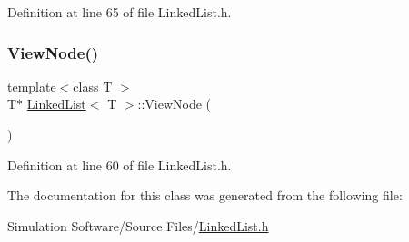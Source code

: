 Definition at line 65 of file Linked\+List.\+h.

\mbox{\label{class_linked_list_a926040c8f7faa215988def48e41797e5}} 
\subsubsection{\texorpdfstring{View\+Node()}{ViewNode()}}
{\footnotesize\ttfamily template$<$class T $>$ \\
T$\ast$ \hyperlink{class_linked_list}{Linked\+List}$<$ T $>$\+::View\+Node (\begin{DoxyParamCaption}{ }\end{DoxyParamCaption})\hspace{0.3cm}{\ttfamily [inline]}}



Definition at line 60 of file Linked\+List.\+h.



The documentation for this class was generated from the following file\+:\begin{DoxyCompactItemize}
\item 
Simulation Software/\+Source Files/\hyperlink{_linked_list_8h}{Linked\+List.\+h}\end{DoxyCompactItemize}
